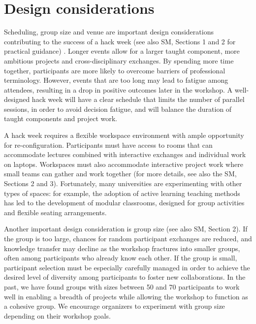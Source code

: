 \section*{Design considerations}

Scheduling, group size and venue are important design considerations contributing to the success of a hack week (see also SM, Sections 1 and 2 for practical guidance) .   
Longer events allow for a larger taught component, more ambitious projects and cross-disciplinary exchanges. 
By spending more time together, participants are more likely to overcome barriers of professional terminology.
However, events that are too long may lead to fatigue among attendees, resulting in a drop in positive outcomes later in the workshop.
A well-designed hack week will have a clear schedule that limits the number of parallel sessions, in order to avoid decision fatigue, and will balance the duration of taught components and project work. 

A hack week requires a flexible workspace environment with ample opportunity for re-configuration. 
Participants must have access to rooms that can accommodate lectures combined with interactive exchanges and individual work on laptops. 
Workspaces must also accommodate interactive project work where small teams can gather and work together (for more details, see also the SM, Sections 2 and 3).    
Fortunately, many universities are experimenting with other types of spaces: for example, the adoption of active learning teaching methods \cite{prince2004} has led to the development of modular classrooms, designed for group activities and flexible seating arrangements.

Another important design consideration is group size (see also SM, Section 2).
If the group is too large, chances for random participant exchanges are reduced, and knowledge transfer may decline as the workshop fractures into smaller groups, often among participants who already know each other.
If the group is small, participant selection must be especially carefully managed in order to achieve the desired level of diversity among participants to foster new collaborations.
In the past, we have found groups with sizes between 50 and 70 participants to work well in enabling a breadth of projects while allowing the workshop to function as a cohesive group. We encourage organizers to experiment with group size depending on their workshop goals.

